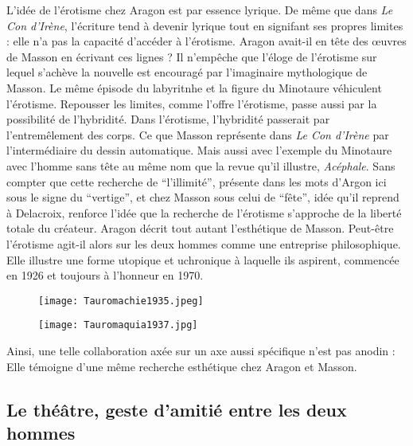 L'idée de l'érotisme chez Aragon est par essence lyrique. De même que dans \emph{Le Con d'Irène}, l'écriture tend à devenir lyrique tout en signifant ses propres limites : elle n'a pas la capacité d'accéder à l'érotisme. Aragon avait-il en tête des \oe{}uvres de Masson en écrivant ces lignes ? Il n'empêche que l'éloge de l'érotisme sur lequel s'achève la nouvelle est encouragé par l'imaginaire mythologique de Masson. Le même épisode du labyritnhe et la figure du Minotaure véhiculent l'érotisme. Repousser les limites, comme l'offre l'érotisme, passe aussi par la possibilité de l'hybridité. Dans l'érotisme, l'hybridité passerait par l'entremêlement des corps. Ce que Masson représente dans \emph{Le Con d'Irène} par l'intermédiaire du dessin automatique. Mais aussi avec l'exemple du Minotaure avec l'homme sans tête au même nom que la revue qu'il illustre, \emph{Acéphale}. Sans compter que cette recherche de \enquote{l'illimité}, présente dans les mots d'Argon ici sous le signe du \enquote{vertige}, et chez Masson sous celui de \enquote{fête}, idée qu'il reprend à Delacroix, renforce l'idée que la recherche de l'érotisme s'approche de la liberté totale du créateur. Aragon décrit tout autant l'esthétique de Masson. Peut-être l'érotisme agit-il alors sur les deux hommes comme une entreprise philosophique. Elle illustre une forme utopique et uchronique à laquelle ils aspirent, commencée en 1926 et toujours à l'honneur en 1970. 


\begin{figure}[H]
   \centering
   \texttt{[image: Tauromachie1935.jpeg]}
	\caption{\cite{noel}}\label{fig:Tauromachie1935}
\end{figure}

\begin{figure}[H]
   \centering
   \texttt{[image: Tauromaquia1937.jpg]}
	\caption{}\label{fig:Tauromachie1937}
\end{figure}


	Ainsi, une telle collaboration axée sur un axe aussi spécifique n’est pas anodin : Elle témoigne d’une même recherche esthétique chez Aragon et Masson. 
\subsection{Le théâtre, geste d'amitié entre les deux hommes}

